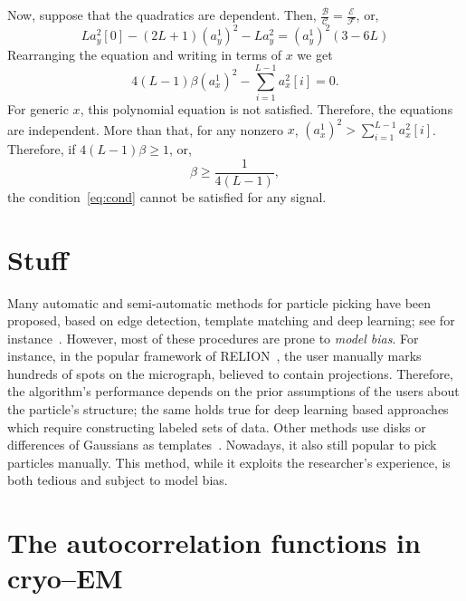 \documentclass[english,11pt]{article}
\newcommand{\1}{\mathbf{1}}
\numberwithin{equation}{section}
\theoremstyle{plain}
\theoremstyle{definition}
\theoremstyle{remark}
\theoremstyle{plain}
\theoremstyle{remark}
\theoremstyle{plain}
\theoremstyle{plain}
\begin{document}
Now, suppose that the quadratics are dependent. Then, $\frac{\mathcal{B}}{\mathcal{C}} =\frac{\mathcal{E}}{\mathcal{F}} $, or, 	
\begin{equation*}
La_y^2[0] - (2L+1)(a_y^1)^2 - La_y^2 = (a_y^1)^2(3-6L)
\end{equation*}
Rearranging the equation and writing in terms of $x$ we get 
\begin{equation} \label{eq:cond}
4(L-1)\beta (a_x^1)^2  - \sum_{i=1}^{L-1} a_x^2[i] = 0.
\end{equation}	
For generic $x$,  this polynomial equation is not satisfied. Therefore,  the equations are independent. 
More than that, for any nonzero $x$, $(a_x^1)^2 >\sum_{i=1}^{L-1} a_x^2[i]$. Therefore, if $4(L-1)\beta \geq 1$, or,
\begin{equation*}
\beta \geq \frac{1}{4(L-1)},
\end{equation*}
the condition~\eqref{eq:cond} cannot be satisfied for any signal. 


\section{Stuff}

Many automatic and semi-automatic methods for particle picking have been proposed, based on edge detection, template matching and deep learning; see for instance~\cite{harauz1989automatic,ogura2004automatic,zhu2016deep,frank1983automatic,scheres2015semi,heimowitz2018apple}. 
However, most of these procedures are prone to \emph{model bias}. For instance, in the popular framework of RELION~\cite{scheres2015semi}, the user manually marks hundreds of spots on the micrograph, believed to contain projections. 
Therefore, the algorithm's performance depends on the prior assumptions of the users about the particle's structure; the same holds true for deep learning based approaches which require constructing labeled sets of data.
Other methods use disks or differences of Gaussians as templates~\cite{langlois2014automated,voss2009dog}.
Nowadays, it also still popular to pick particles manually. This method, while it exploits the researcher's experience, is both tedious and subject to model bias.

\section{The autocorrelation functions in cryo--EM} \label{sec:cryoem}
\end{document}
